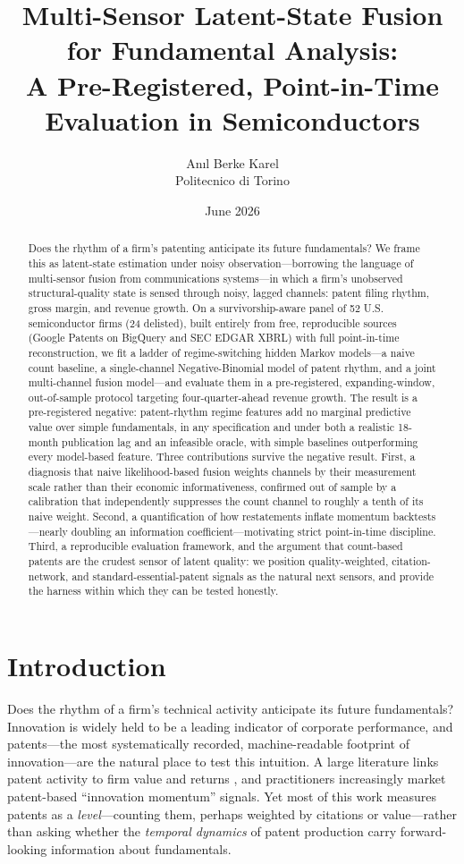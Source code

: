 \documentclass[11pt]{article}
\title{Multi-Sensor Latent-State Fusion for Fundamental Analysis:\\
A Pre-Registered, Point-in-Time Evaluation in Semiconductors}
\author{An\i{}l Berke Karel\\ Politecnico di Torino}
\date{June 2026}
\begin{document}
\maketitle

\begin{abstract}
Does the rhythm of a firm's patenting anticipate its future fundamentals? We frame this as latent-state estimation under noisy observation---borrowing the language of multi-sensor fusion from communications systems---in which a firm's unobserved structural-quality state is sensed through noisy, lagged channels: patent filing rhythm, gross margin, and revenue growth. On a survivorship-aware panel of 52 U.S. semiconductor firms (24 delisted), built entirely from free, reproducible sources (Google Patents on BigQuery and SEC EDGAR XBRL) with full point-in-time reconstruction, we fit a ladder of regime-switching hidden Markov models---a naive count baseline, a single-channel Negative-Binomial model of patent rhythm, and a joint multi-channel fusion model---and evaluate them in a pre-registered, expanding-window, out-of-sample protocol targeting four-quarter-ahead revenue growth. The result is a pre-registered negative: patent-rhythm regime features add no marginal predictive value over simple fundamentals, in any specification and under both a realistic 18-month publication lag and an infeasible oracle, with simple baselines outperforming every model-based feature. Three contributions survive the negative result. First, a diagnosis that naive likelihood-based fusion weights channels by their measurement scale rather than their economic informativeness, confirmed out of sample by a calibration that independently suppresses the count channel to roughly a tenth of its naive weight. Second, a quantification of how restatements inflate momentum backtests---nearly doubling an information coefficient---motivating strict point-in-time discipline. Third, a reproducible evaluation framework, and the argument that count-based patents are the crudest sensor of latent quality: we position quality-weighted, citation-network, and standard-essential-patent signals as the natural next sensors, and provide the harness within which they can be tested honestly.
\end{abstract}

\section{Introduction}

Does the rhythm of a firm's technical activity anticipate its future fundamentals? Innovation is widely held to be a leading indicator of corporate performance, and patents---the most systematically recorded, machine-readable footprint of innovation---are the natural place to test this intuition. A large literature links patent activity to firm value and returns \citep{kogan2017}, and practitioners increasingly market patent-based ``innovation momentum'' signals. Yet most of this work measures patents as a \emph{level}---counting them, perhaps weighted by citations or value---rather than asking whether the \emph{temporal dynamics} of patent production carry forward-looking information about fundamentals.
\end{document}
